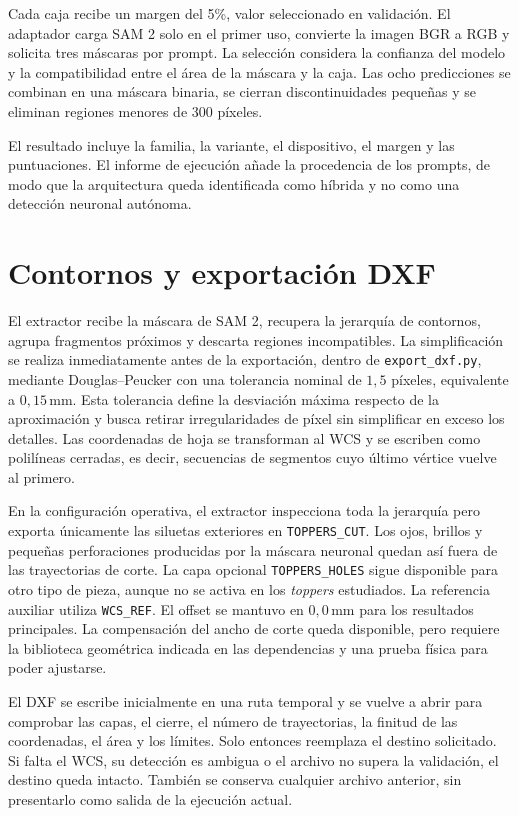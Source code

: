Cada caja recibe un margen del 5\%, valor seleccionado en validación. El adaptador carga SAM 2 solo en el primer uso, convierte la imagen BGR a RGB y solicita tres máscaras por prompt. La selección considera la confianza del modelo y la compatibilidad entre el área de la máscara y la caja. Las ocho predicciones se combinan en una máscara binaria, se cierran discontinuidades pequeñas y se eliminan regiones menores de 300 píxeles.

El resultado incluye la familia, la variante, el dispositivo, el margen y las puntuaciones. El informe de ejecución añade la procedencia de los prompts, de modo que la arquitectura queda identificada como híbrida y no como una detección neuronal autónoma.

\section{Contornos y exportación DXF}

El extractor recibe la máscara de SAM 2, recupera la jerarquía de contornos, agrupa fragmentos próximos y descarta regiones incompatibles. La simplificación se realiza inmediatamente antes de la exportación, dentro de \texttt{export\_dxf.py}, mediante Douglas--Peucker con una tolerancia nominal de $1{,}5$ píxeles, equivalente a $0{,}15\,\text{mm}$. Esta tolerancia define la desviación máxima respecto de la aproximación y busca retirar irregularidades de píxel sin simplificar en exceso los detalles. Las coordenadas de hoja se transforman al WCS y se escriben como polilíneas cerradas, es decir, secuencias de segmentos cuyo último vértice vuelve al primero.

En la configuración operativa, el extractor inspecciona toda la jerarquía pero exporta únicamente las siluetas exteriores en \texttt{TOPPERS\_CUT}. Los ojos, brillos y pequeñas perforaciones producidas por la máscara neuronal quedan así fuera de las trayectorias de corte. La capa opcional \texttt{TOPPERS\_HOLES} sigue disponible para otro tipo de pieza, aunque no se activa en los \textit{toppers} estudiados. La referencia auxiliar utiliza \texttt{WCS\_REF}. El offset se mantuvo en $0{,}0\,\text{mm}$ para los resultados principales. La compensación del ancho de corte queda disponible, pero requiere la biblioteca geométrica indicada en las dependencias y una prueba física para poder ajustarse.

El DXF se escribe inicialmente en una ruta temporal y se vuelve a abrir para comprobar las capas, el cierre, el número de trayectorias, la finitud de las coordenadas, el área y los límites. Solo entonces reemplaza el destino solicitado. Si falta el WCS, su detección es ambigua o el archivo no supera la validación, el destino queda intacto. También se conserva cualquier archivo anterior, sin presentarlo como salida de la ejecución actual.

